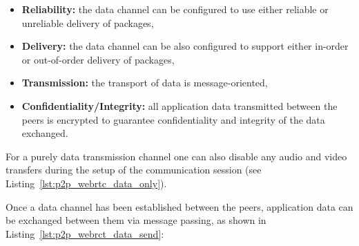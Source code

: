\begin{itemize}
		\item \textbf{Reliability:} the data channel can be configured to use either reliable or unreliable delivery of packages,
		\item \textbf{Delivery:} the data channel can be also configured to support either in-order or out-of-order delivery of packages,
		\item \textbf{Transmission:} the transport of data is message-oriented,
		\item \textbf{Confidentiality/Integrity:} all application data transmitted between the peers is encrypted to guarantee confidentiality and integrity of the data exchanged.
\end{itemize}

For a purely data transmission channel one can also disable any audio and video transfers during the setup of the communication session (see Listing~\ref{lst:p2p_webrtc_data_only}). \@


Once a data channel has been established between the peers, application data can be exchanged between them via message passing, as shown in Listing~\ref{lst:p2p_webrct_data_send}: \@



